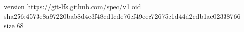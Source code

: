version https://git-lfs.github.com/spec/v1
oid sha256:4573e8a97220bab8d4e3f48cd1cde76cf49eec72675e1d44d2cdb1ac02338766
size 68

